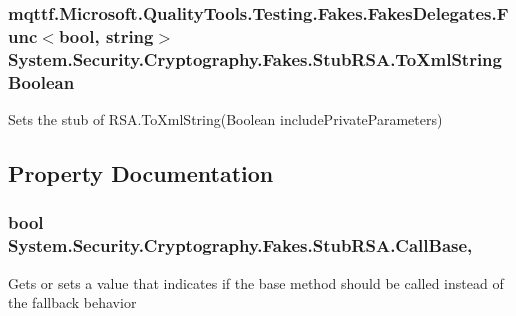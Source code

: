 \hypertarget{class_system_1_1_security_1_1_cryptography_1_1_fakes_1_1_stub_r_s_a_af38cfe34d157647c04e3afca8cb82e12}{
\subsubsection[{To\-Xml\-String\-Boolean}]{\setlength{\rightskip}{0pt plus 5cm}mqttf.\-Microsoft.\-Quality\-Tools.\-Testing.\-Fakes.\-Fakes\-Delegates.\-Func$<$bool, string$>$ System.\-Security.\-Cryptography.\-Fakes.\-Stub\-R\-S\-A.\-To\-Xml\-String\-Boolean}}\label{class_system_1_1_security_1_1_cryptography_1_1_fakes_1_1_stub_r_s_a_af38cfe34d157647c04e3afca8cb82e12}


Sets the stub of R\-S\-A.\-To\-Xml\-String(\-Boolean include\-Private\-Parameters)



\subsection{Property Documentation}
\hypertarget{class_system_1_1_security_1_1_cryptography_1_1_fakes_1_1_stub_r_s_a_a261c22ee43137df07c594670e18fe8f2}{
\subsubsection[{Call\-Base}]{\setlength{\rightskip}{0pt plus 5cm}bool System.\-Security.\-Cryptography.\-Fakes.\-Stub\-R\-S\-A.\-Call\-Base\hspace{0.3cm}{\ttfamily [get]}, {\ttfamily [set]}}}\label{class_system_1_1_security_1_1_cryptography_1_1_fakes_1_1_stub_r_s_a_a261c22ee43137df07c594670e18fe8f2}


Gets or sets a value that indicates if the base method should be called instead of the fallback behavior

